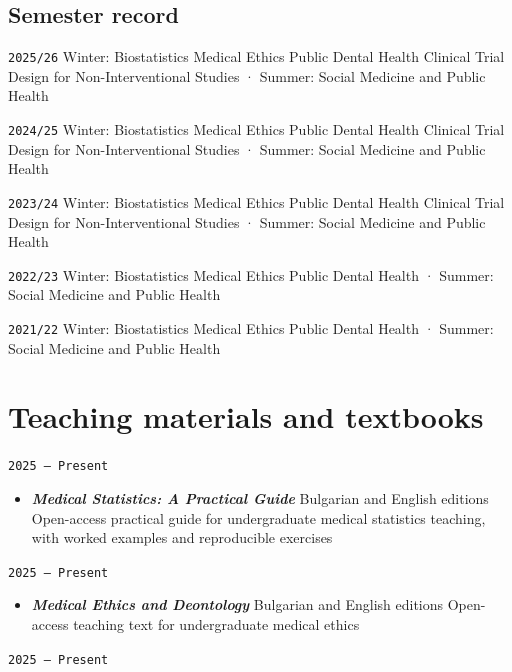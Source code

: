 \documentclass[
  10.5pt,
  a4paper,
  DIV=11,
  numbers=noendperiod]{scrartcl}
\providecommand{\tightlist}{%
  \setlength{\itemsep}{0pt}\setlength{\parskip}{0pt}}
\let\oldtexttt\texttt
\renewcommand{\texttt}[1]{{\color{cvbronze}\small\oldtexttt{#1}}}
\begin{document}
\subsection{Semester record}\label{semester-record}

\texttt{2025/26} Winter: Biostatistics \textbar{} Medical Ethics
\textbar{} Public Dental Health \textbar{} Clinical Trial Design for
Non-Interventional Studies · Summer: Social Medicine and Public Health

\texttt{2024/25} Winter: Biostatistics \textbar{} Medical Ethics
\textbar{} Public Dental Health \textbar{} Clinical Trial Design for
Non-Interventional Studies · Summer: Social Medicine and Public Health

\texttt{2023/24} Winter: Biostatistics \textbar{} Medical Ethics
\textbar{} Public Dental Health \textbar{} Clinical Trial Design for
Non-Interventional Studies · Summer: Social Medicine and Public Health

\texttt{2022/23} Winter: Biostatistics \textbar{} Medical Ethics
\textbar{} Public Dental Health · Summer: Social Medicine and Public
Health

\texttt{2021/22} Winter: Biostatistics \textbar{} Medical Ethics
\textbar{} Public Dental Health · Summer: Social Medicine and Public
Health

\section{Teaching materials and
textbooks}\label{teaching-materials-and-textbooks}

\texttt{2025\ –\ Present}

\begin{itemize}
\tightlist
\item
  \textbf{\emph{Medical Statistics: A Practical Guide}} \textbar{}
  Bulgarian and English editions \textbar{} Open-access practical guide
  for undergraduate medical statistics teaching, with worked examples
  and reproducible exercises
\end{itemize}

\texttt{2025\ –\ Present}

\begin{itemize}
\tightlist
\item
  \textbf{\emph{Medical Ethics and Deontology}} \textbar{} Bulgarian and
  English editions \textbar{} Open-access teaching text for
  undergraduate medical ethics
\end{itemize}

\texttt{2025\ –\ Present}
\end{document}
